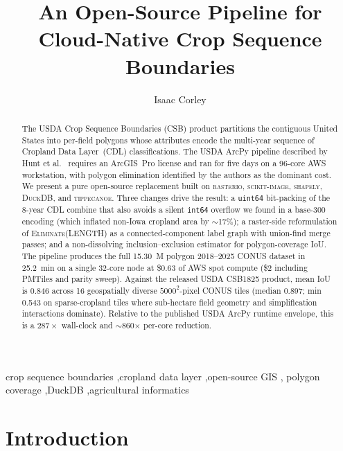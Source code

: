\documentclass[preprint,12pt]{elsarticle}
\begin{document}
\begin{frontmatter}

\title{An Open-Source Pipeline for Cloud-Native Crop Sequence Boundaries}

\author[a]{Isaac Corley}

\begin{abstract}
The USDA Crop Sequence Boundaries (CSB) product partitions the contiguous
United States into per-field polygons whose attributes encode the multi-year
sequence of Cropland Data Layer~(CDL) classifications. The USDA ArcPy
pipeline described by Hunt et al.~\cite{hunt2024csb} requires an
ArcGIS~Pro license and ran for five days on a 96-core AWS workstation,
with polygon elimination identified by the authors as the dominant cost.
We present a pure open-source replacement built on \textsc{rasterio},
\textsc{scikit-image}, \textsc{shapely}, \textsc{DuckDB}, and
\textsc{tippecanoe}. Three changes drive the result: a \texttt{uint64}
bit-packing of the 8-year CDL combine that also avoids a silent \texttt{int64}
overflow we found in a base-300 encoding (which inflated non-Iowa cropland
area by $\sim$17\%); a raster-side reformulation of \textsc{Eliminate(LENGTH)}
as a connected-component label graph with union-find merge passes; and a
non-dissolving inclusion--exclusion estimator for polygon-coverage IoU. The
pipeline produces the full 15.30~M polygon 2018--2025 CONUS dataset in
25.2~min on a single 32-core node at \$0.63 of AWS spot compute (\$2
including PMTiles and parity sweep). Against the released USDA CSB1825
product, mean IoU is 0.846 across 16 geospatially diverse $5000^2$-pixel
CONUS tiles (median 0.897; min 0.543 on sparse-cropland tiles where
sub-hectare field geometry and simplification interactions dominate).
Relative to the published USDA ArcPy runtime envelope, this is a
$287\times$ wall-clock and $\sim$860$\times$ per-core reduction.
\end{abstract}

\begin{keyword}
crop sequence boundaries \sep cropland data layer \sep open-source GIS \sep
polygon coverage \sep DuckDB \sep agricultural informatics
\end{keyword}

\end{frontmatter}

\section{Introduction}
\label{sec:intro}
\end{document}
